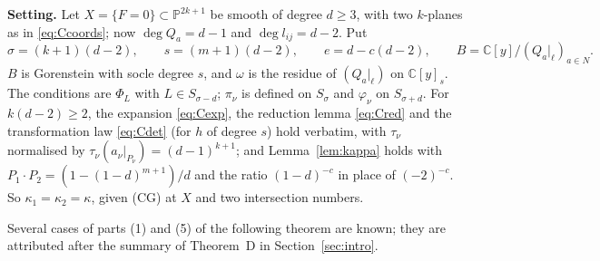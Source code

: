 \documentclass[10pt]{article}
\numberwithin{equation}{section}
\theoremstyle{remark}
\newcommand{\PP}{\mathbb{P}}
\newcommand{\CC}{\mathbb{C}}
\newcommand{\run}[1]{\medskip\noindent\textbf{#1}}
\begin{document}
\run{Setting.} Let $X=\{F=0\}\subset\PP^{2k+1}$ be smooth of degree $d\ge3$, with two $k$-planes as in
\eqref{eq:Ccoords}; now $\deg Q_a=d-1$ and $\deg l_{ij}=d-2$. Put
\[
\sigma=(k+1)(d-2),\qquad s=(m+1)(d-2),\qquad e=d-c(d-2),\qquad B=\CC[y]/(Q_a|_\ell)_{a\in N}.
\]
$B$ is Gorenstein with socle degree $s$, and $\omega$ is the residue of $(Q_a|_\ell)$ on $\CC[y]_s$. The
conditions are $\Phi_L$ with $L\in S_{\sigma-d}$; $\pi_\nu$ is defined on $S_\sigma$ and $\varphi_\nu$ on
$S_{\sigma+d}$. For $k(d-2)\ge2$, the expansion \eqref{eq:Cexp}, the reduction lemma \eqref{eq:Cred} and the
transformation law \eqref{eq:Cdet} (for $h$ of degree $s$) hold verbatim, with $\tau_\nu$ normalised by
$\tau_\nu(a_\nu|_{P_\nu})=(d-1)^{k+1}$; and Lemma~\ref{lem:kappa} holds with $P_1\cdot P_2=(1-(1-d)^{m+1})/d$ and
the ratio $(1-d)^{-c}$ in place of $(-2)^{-c}$. So $\kappa_1=\kappa_2=\kappa$, given (CG) at $X$ and two
intersection numbers.

Several cases of parts (1) and (5) of the following theorem are known; they are attributed after the summary
of Theorem~D in Section~\ref{sec:intro}.
\end{document}

